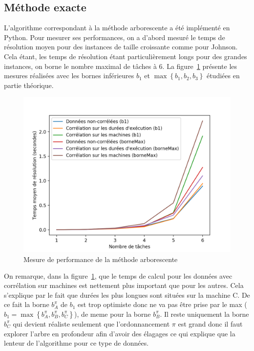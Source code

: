 \documentclass[a4paper, 10pt]{article}
\begin{document}
		\subsection*{Méthode exacte}
		
	L'algorithme correspondant à la méthode arborescente a été implémenté en Python. Pour mesurer ses performances, on a d'abord mesuré le temps de résolution moyen pour des instances de taille croissante comme pour Johnson. Cela étant, les temps de résolution étant particulièrement longs pour des grandes instances, on borne le nombre maximal de tâches à 6. La figure~\ref{fig:temps_exact} présente les mesures réalisées avec les bornes inférieures $b_1$ et $\max\left\{ b_1, b_2, b_3 \right\}$ étudiées en partie théorique.
		
		\begin{figure}[h]
			\centering
			\includegraphics[width=0.85\linewidth]{graphes/time_exact_20iter_b1bmax.png}
			\caption{Mesure de performance de la méthode arborescente}
			\label{fig:temps_exact}
		\end{figure}
		
	On remarque, dans la figure~\ref{fig:temps_exact}, que le temps de calcul pour les données avec corrélation sur machines est nettement plus important que pour les autres. Cela s'explique par le fait que durées les plus longues sont situées sur la machine C. De ce fait la borne $b^\pi_A$ de $b_1$ est trop optimiste donc ne va pas être prise par le max ($b_1 = \max\left\{b^\pi_A, b^\pi_B, b^\pi_C\right\}$), de meme pour la borne $b^\pi_B$. Il reste uniquement la borne $b^\pi_C$ qui devient réaliste seulement que l'ordonnancement $\pi$ est grand donc il faut explorer l'arbre en profondeur afin d'avoir des élagages ce qui explique que la lenteur de l'algorithme pour ce type de données.
		
\end{document}
